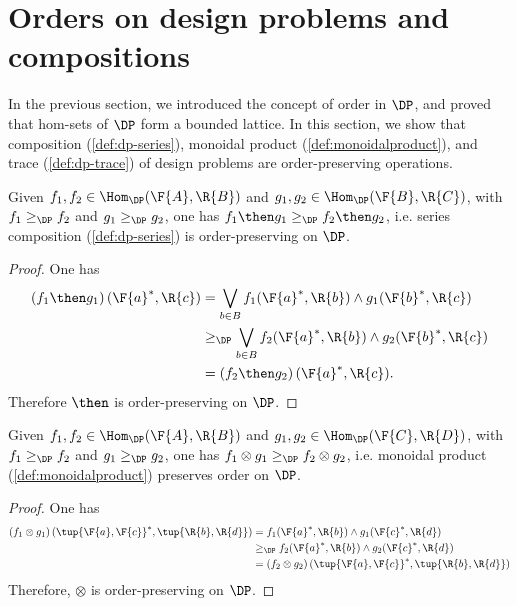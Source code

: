 \section{Orders on design problems and compositions}
In the previous section, we introduced the concept of order in $\DP$, and proved that hom-sets of $\DP$ form a bounded lattice. In this section, we show that composition (\cref{def:dp-series}), monoidal product (\cref{def:monoidalproduct}), and trace (\cref{def:dp-trace}) of design problems are order-preserving operations.
\begin{lemma}
Given $f_1,f_2 \in \Hom_\DP(\F{A},\R{B})$ and $g_1,g_2 \in \Hom_\DP(\F{B},\R{C})$, with $f_1\geq_\DP f_2$ and $g_1\geq_\DP g_2$, one has $f_1\then g_1 \geq_\DP f_2\then g_2$, i.e. series composition (\cref{def:dp-series}) is order-preserving on $\DP$.
\end{lemma}

\begin{proof}
One has
\begin{equation}
    \begin{aligned}
    \left( f_1\then g_1\right)(\F{a}^*,\R{c})&=\bigvee_{b\in B}f_1(\F{a}^*,\R{b})\wedge g_1(\F{b}^*,\R{c})\\
    &\geq_\DP \bigvee_{b\in B} f_2(\F{a}^*,\R{b})\wedge g_2(\F{b}^*,\R{c})\\
    &=\left( f_2\then g_2\right)(\F{a}^*,\R{c}).
    \end{aligned}
\end{equation}
Therefore $\then$ is order-preserving on $\DP$.
\end{proof}

\begin{lemma}
Given $f_1,f_2 \in \Hom_\DP(\F{A},\R{B})$ and $g_1,g_2 \in \Hom_\DP(\F{C},\R{D})$, with $f_1\geq_\DP f_2$ and $g_1\geq_\DP g_2$, one has $f_1\otimes g_1 \geq_\DP f_2\otimes g_2$, i.e. monoidal product (\cref{def:monoidalproduct}) preserves order on $\DP$.
\end{lemma}

\begin{proof}
One has 
\begin{equation}
    \begin{aligned}
    \left( f_1\otimes g_1\right) (\tup{\F{a},\F{c}}^*,\tup{\R{b},\R{d}})&=f_1(\F{a}^*,\R{b})\wedge g_1(\F{c}^*,\R{d})\\
    &\geq_\DP f_2(\F{a}^*,\R{b})\wedge g_2(\F{c}^*,\R{d})\\
    &=\left( f_2\otimes g_2\right) (\tup{\F{a},\F{c}}^*,\tup{\R{b},\R{d}})
    \end{aligned}
\end{equation}
Therefore, $\otimes$ is order-preserving on $\DP$.
\end{proof}

